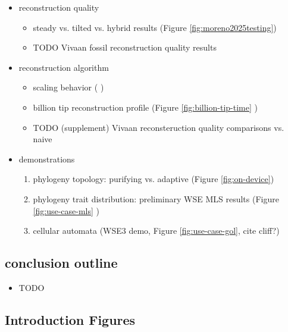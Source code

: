 \begin{itemize}
\item reconstruction quality
   \begin{itemize}
   \item steady vs. tilted vs. hybrid results (Figure \ref{fig:moreno2025testing})
   \item TODO Vivaan fossil reconstruction quality results
   \end{itemize}
\item reconstruction algorithm
   \begin{itemize}
  \item scaling behavior ( \citep{singhvi2025scalable})
   \item billion tip reconstruction profile (Figure \ref{fig:billion-tip-time} \citep{singhvi2025scalable})
   \item TODO (supplement) Vivaan reconsteruction quality comparisons vs. naive
   \end{itemize}
\item demonstrations
  \begin{enumerate}
  \item phylogeny topology: purifying vs. adaptive (Figure \ref{fig:on-device}) \citep{moreno2024trackable}
  \item phylogeny trait distribution: preliminary WSE MLS results (Figure \ref{fig:use-case-mls} \citep{moreno2025extending})
  \item cellular automata (WSE3 demo, Figure \ref{fig:use-case-gol}, cite cliff?)
  \end{enumerate}
\end{itemize}

\subsection{conclusion outline}

\begin{itemize}
\item TODO
\end{itemize}

\subsection{Introduction Figures}

\FloatBarrier








